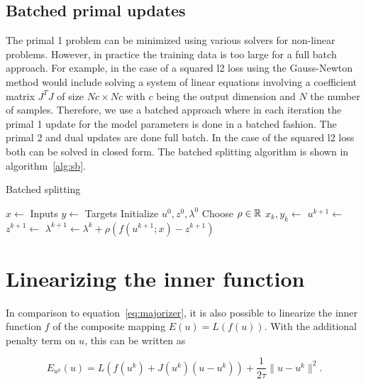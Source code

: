 \documentclass[english,11pt,a4paper]{article}
\begin{document}
\subsection{Batched primal updates}

The primal 1 problem can be minimized using various solvers for non-linear problems. However, in practice the training data is too large for a full batch approach. For example, in the case of a squared l2 loss using the Gauss-Newton method would include solving a system of linear equations involving a coefficient matrix $J^T J$ of size $Nc \times Nc$ with $c$ being the output dimension and $N$ the number of samples. Therefore, we use a batched approach where in each iteration the primal 1 update for the model parameters is done in a batched fashion. The primal 2 and dual updates are done full batch. In the case of the squared l2 loss both can be solved in closed form. The batched splitting algorithm is shown in algorithm~\ref{alg:sb}.

\begin{algorithm}
	\caption{Batched splitting}
	\label{alg:sb}
	\begin{algorithmic}[1]
		\State $x \gets$ Inputs
		\State $y \gets$ Targets
		\State Initialize $u^0, z^0, \lambda^0$
		\State Choose $\rho \in \mathbb{R}$
			\State $x_k, y_k \gets$ 
			\State $u^{k+1} \gets$  
			\State $z^{k+1} \gets$  
			\State $\lambda^{k+1} \gets \lambda^k + \rho (f(u^{k+1};x)-z^{k+1})$ 
		\EndFor
	\end{algorithmic}
\end{algorithm}

\section{Linearizing the inner function}


In comparison to equation~\ref{eq:majorizer}, it is also possible to linearize the inner function $f$ of the composite mapping $E(u) = L(f(u))$. With the additional penalty term on $u$, this can be written as

\begin{equation}
	E_{u^k}(u) = L(f(u^k) + J(u^k)(u-u^k)) + \frac{1}{2 \tau} \| u - u^k \|^2.	\label{eq:composite_inner_linearization}
\end{equation}
\end{document}
